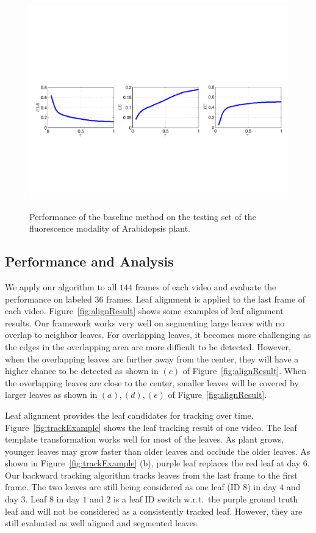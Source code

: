 \begin{figure}
\centering
\includegraphics[width=.81\textwidth]{Figures/performance.pdf}\\
\caption{Performance of the baseline method on the testing set of the fluorescence modality of Arabidopsis plant.}
\label{fig:performance}
\end{figure}


\subsection{Performance and Analysis}
We apply our algorithm to all $144$ frames of each video and evaluate the performance on labeled $36$ frames.
Leaf alignment is applied to the last frame of each video.
Figure~\ref{fig:alignResult} shows some examples of leaf alignment results.
Our framework works very well on segmenting large leaves with no overlap to neighbor leaves.
For overlapping leaves, it becomes more challenging as the edges in the overlapping area are more difficult to be detected.
However, when the overlapping leaves are further away from the center, they will have a higher chance to be detected as shown in $(c)$ of Figure~\ref{fig:alignResult}.
When the overlapping leaves are close to the center, smaller leaves will be covered by larger leaves as shown in $(a), (d), (e)$ of Figure~\ref{fig:alignResult}.


Leaf alignment provides the leaf candidates for tracking over time. 
Figure~\ref{fig:trackExample} shows the leaf tracking result of one video.
The leaf template transformation works well for most of the leaves.
As plant grows, younger leaves may grow faster than older leaves and occlude the older leaves.
As shown in Figure~\ref{fig:trackExample} (b), purple leaf replaces the red leaf at day $6$.
Our backward tracking algorithm tracks leaves from the last frame to the first frame.
The two leaves are still being considered as one leaf (ID $8$) in day $4$ and day $3$.
Leaf $8$ in day $1$ and $2$ is a leaf ID switch w.r.t.~the purple ground truth leaf and will not be considered as a consistently tracked leaf.
However, they are still evaluated as well aligned and segmented leaves.


